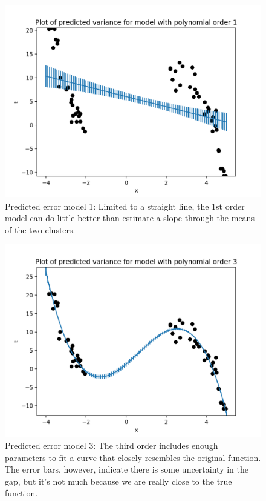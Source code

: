 \documentclass[10pt]{article}
\begin{document}
\begin{itemize}
\begin{figure}[H]
\centering
  \includegraphics[width=\linewidth]{error-1.png}
 \caption{Predicted error model 1: Limited to a straight line, the 1st order model can do little better than estimate a slope through the means of the two clusters.}
\label{label}
\end{figure}

\begin{figure}[H]
\centering
  \includegraphics[width=\linewidth]{error-3.png}
 \caption{Predicted error model 3: The third order includes enough parameters to fit a curve that closely resembles the original function. The error bars, however, indicate there is some uncertainty in the gap, but it's not much because we are really close to the true function.}
\label{label}
\end{figure}


\end{itemize}
\end{document}
